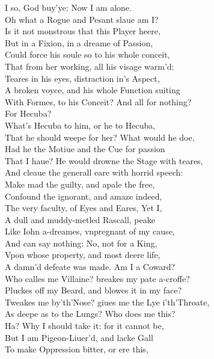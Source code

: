 \documentclass[a5paper,DIV=calc,11pt]{scrbook}
\begin{document}
\begin{drama*}
    \hamspeaks I so, God buy'ye: Now I am alone.\\
    Oh what a Rogue and Pesant slaue am I?\\
    Is it not monstrous that this Player heere,\\
    But in a Fixion, in a dreame of Passion,\\
    Could force his soule so to his whole conceit,\\
    That from her working, all his visage warm'd:\\
    Teares in his eyes, distraction in's Aspect,\\
    A broken voyce, and his whole Function suiting\\
    With Formes, to his Conceit? And all for nothing?\\
    For Hecuba?\\
    What's Hecuba to him, or he to Hecuba,\\
    That he should weepe for her? What would he doe,\\
    Had he the Motiue and the Cue for passion\\
    That I haue? He would drowne the Stage with teares,\\
    And cleaue the generall eare with horrid speech:\\
    Make mad the guilty, and apale the free,\\
    Confound the ignorant, and amaze indeed,\\
    The very faculty, of Eyes and Eares, Yet I,\\
    A dull and muddy-metled Rascall, peake\\
    Like Iohn a-dreames, vnpregnant of my cause,\\
    And can say nothing: No, not for a King,\\
    Vpon whose property, and most deere life,\\
    A damn'd defeate was made. Am I a Coward?\\
    Who calles me Villaine? breakes my pate a-croffe?\\
    Pluckes off my Beard, and blowes it in my face?\\
    Tweakes me by'th'Nose? giues me the Lye i'th'Throate,\\
    As deepe as to the Lungs? Who does me this?\\
    Ha? Why I should take it: for it cannot be,\\
    But I am Pigeon-Liuer'd, and lacke Gall\\
    To make Oppression bitter, or ere this,\\

\end{drama*}
\end{document}
